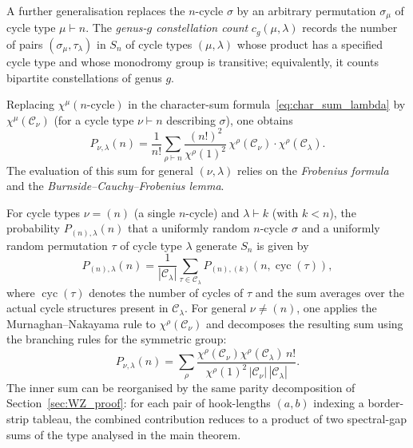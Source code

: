A further generalisation replaces the $n$-cycle $\sigma$ by an arbitrary
permutation $\sigma_\mu$ of cycle type $\mu\vdash n$.  The
\emph{genus-$g$ constellation count} $c_g(\mu,\lambda)$ records the number
of pairs $(\sigma_\mu,\tau_\lambda)$ in $S_n$ of cycle types $(\mu,\lambda)$
whose product has a specified cycle type and whose monodromy group is
transitive; equivalently, it counts bipartite constellations of genus $g$.

Replacing $\chi^\mu(n\text{-cycle})$ in the character-sum
formula~\eqref{eq:char_sum_lambda} by $\chi^\mu(\mathcal{C}_\nu)$ (for a
cycle type $\nu\vdash n$ describing $\sigma$), one obtains
\begin{equation}\label{eq:general_char_sum}
  P_{\nu,\lambda}(n)
  = \frac{1}{n!}\sum_{\rho\vdash n}
    \frac{(n!)^2}{\chi^\rho(1)^2}\,
    \chi^\rho(\mathcal{C}_\nu)\cdot\chi^\rho(\mathcal{C}_\lambda).
\end{equation}
The evaluation of this sum for general $(\nu,\lambda)$ relies on the
\emph{Frobenius formula} and the \emph{Burnside–Cauchy–Frobenius lemma}.

\begin{theorem}\label{thm:general_cycle}
For cycle types $\nu=(n)$ (a single $n$-cycle) and $\lambda\vdash k$ (with
$k<n$), the probability $P_{(n),\lambda}(n)$ that a uniformly random
$n$-cycle $\sigma$ and a uniformly random permutation $\tau$ of cycle type
$\lambda$ generate $S_n$ is given by
\begin{equation}\label{eq:gen_formula}
  P_{(n),\lambda}(n)
  = \frac{1}{|\mathcal{C}_\lambda|}
    \sum_{\tau\in\mathcal{C}_\lambda}
    P_{(n),(k)}(n,\operatorname{cyc}(\tau)),
\end{equation}
where $\operatorname{cyc}(\tau)$ denotes the number of cycles of $\tau$ and
the sum averages over the actual cycle structures present in $\mathcal{C}_\lambda$.
For general $\nu\ne(n)$, one applies the Murnaghan–Nakayama rule to
$\chi^\rho(\mathcal{C}_\nu)$ and decomposes the resulting sum using the
branching rules for the symmetric group:
\[
  P_{\nu,\lambda}(n)
  = \sum_\rho
    \frac{\chi^\rho(\mathcal{C}_\nu)\chi^\rho(\mathcal{C}_\lambda)\,n!}
         {\chi^\rho(1)^2\,|\mathcal{C}_\nu|\,|\mathcal{C}_\lambda|}.
\]
The inner sum can be reorganised by the same parity decomposition of
Section~\ref{sec:WZ_proof}: for each pair of hook-lengths $(a,b)$ indexing a
border-strip tableau, the combined contribution reduces to a product of two
spectral-gap sums of the type analysed in the main theorem.
\end{theorem}

